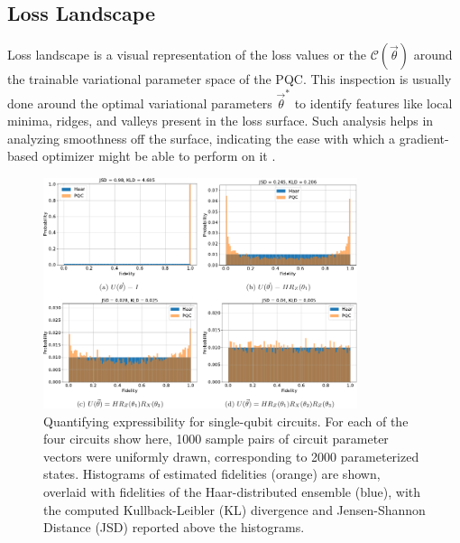 \documentclass[%
 reprint,
 amsmath,
 amssymb,
 showkeys,
 pra,
 floatfix,
]{revtex4-2}
\begin{document}
\subsection{Loss Landscape}

Loss landscape is a visual representation of the loss values or the $\mathcal{C}(\vec{\theta})$ around the trainable variational parameter space of the PQC. This inspection is usually done around the optimal variational parameters $\vec{\theta}^{*}$ to identify features like local minima, ridges, and valleys present in the loss surface. Such analysis helps in analyzing smoothness off the surface, indicating the ease with which a gradient-based optimizer might be able to perform on it \citep{loss-landscapes}. 

\begin{figure}[!tp]
    \centering
    \includegraphics[width=0.82\textwidth]{images/expressibility.pdf}
    \caption[Quantifying expressibility for single-qubit circuits]{Quantifying expressibility for single-qubit circuits. For each of the four circuits show here, 1000 sample pairs of circuit parameter vectors were uniformly drawn, corresponding to 2000 parameterized states. Histograms of estimated fidelities (orange) are shown, overlaid with fidelities of the Haar-distributed ensemble (blue), with the computed Kullback-Leibler (KL) divergence and Jensen-Shannon Distance (JSD) reported above the histograms.}
    \label{fig:expressibility}
\end{figure}
\end{document}
